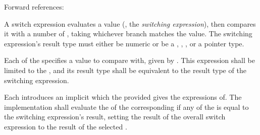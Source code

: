 
\begin{grammar}
 \\
	 \terminal{(}  \terminal{)} \terminal{\{}  \terminal{\}} \\

 \\
	  \\

 \\
	  \terminal{=>}  \\
	 \terminal{=>}  \\

 \\
	 \optional{\terminal{,}} \\
	 \terminal{,}  \\
\end{grammar}

Forward references: 

\specsubsubitem
A switch expression evaluates a value (, the
\textit{switching expression}), then compares it with a number of
, taking whichever branch matches the value. The
switching expression's result type must either be numeric or be a
, , , or a pointer type.

\specsubsubitem
Each of the  specifies a value to compare with, given
by . This expression shall be limited to the
, and its result type shall be
equivalent to the result type of the switching expression.

\specsubsubitem
Each  introduces an implicit
 which the provided
 gives the expressions of. The implementation
shall evaluate the  of the corresponding
 if any of the  is equal to
the switching expression's result, setting the result of the overall switch
expression to the result of the selected .


